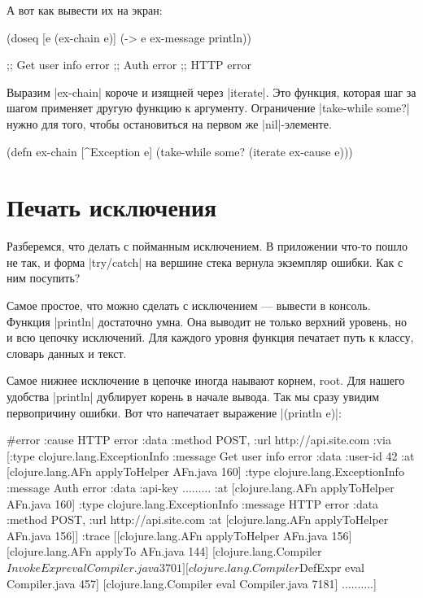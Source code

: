 А вот как вывести их на экран:

\begin{code}
(doseq [e (ex-chain e)]
  (-> e ex-message println))

;; Get user info error
;; Auth error
;; HTTP error
\end{code}

Выразим \spverb|ex-chain| короче и изящней через \spverb|iterate|. Это функция, которая шаг за
шагом применяет другую функцию к аргументу. Ограничение \spverb|take-while some?| нужно
для того, чтобы остановиться на первом же \spverb|nil|-элементе.

\begin{code}
(defn ex-chain
  [^Exception e]
  (take-while some? (iterate ex-cause e)))
\end{code}

\section{Печать исключения}

Разберемся, что делать с пойманным исключением. В приложении что-то пошло не
так, и форма \spverb|try/catch| на вершине стека вернула экземпляр ошибки. Как с ним
посупить?

Самое простое, что можно сделать с исключением — вывести в консоль. Функция
\spverb|println| достаточно умна. Она выводит не только верхний уровень, но и всю
цепочку исключений. Для каждого уровня функция печатает путь к классу, словарь
данных и текст.

Самое нижнее исключение в цепочке иногда наывают корнем, root. Для нашего
удобства \spverb|println| дублирует корень в начале вывода. Так мы сразу увидим
первопричину ошибки. Вот что напечатает выражение \spverb|(println e)|:

\begin{code}
#error {
 :cause HTTP error
 :data {:method POST, :url http://api.site.com}
 :via
 [{:type clojure.lang.ExceptionInfo
   :message Get user info error
   :data {:user-id 42}
   :at [clojure.lang.AFn applyToHelper AFn.java 160]}
  {:type clojure.lang.ExceptionInfo
   :message Auth error
   :data {:api-key .........}
   :at [clojure.lang.AFn applyToHelper AFn.java 160]}
  {:type clojure.lang.ExceptionInfo
   :message HTTP error
   :data {:method POST, :url http://api.site.com}
   :at [clojure.lang.AFn applyToHelper AFn.java 156]}]
 :trace
 [[clojure.lang.AFn applyToHelper AFn.java 156]
  [clojure.lang.AFn applyTo AFn.java 144]
  [clojure.lang.Compiler$InvokeExpr eval Compiler.java 3701]
  [clojure.lang.Compiler$DefExpr eval Compiler.java 457]
  [clojure.lang.Compiler eval Compiler.java 7181]
  ..........]}
\end{code}

